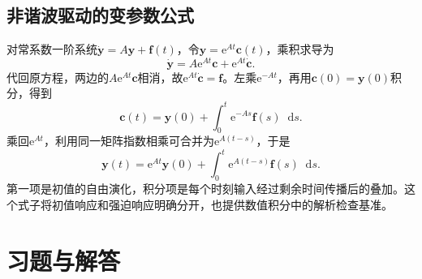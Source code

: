 \documentclass[11pt,openany,fontset=fandol]{ctexbook}
\theoremstyle{plain}\newtheorem{theorem}{定理}[chapter]\newtheorem{proposition}[theorem]{命题}
\theoremstyle{definition}\newtheorem{definition}{定义}[chapter]\newtheorem{example}{例}[chapter]
\theoremstyle{remark}\newtheorem*{remark}{说明}
\newcommand{\dd}{\mathop{}\!\mathrm d}\newcommand{\ii}{\mathrm i}\newcommand{\ee}{\mathrm e}
\newcommand{\vct}[1]{\bm{#1}}\newcommand{\Rea}{\operatorname{Re}}\newcommand{\Ima}{\operatorname{Im}}
\begin{document}
\subsection{非谐波驱动的变参数公式}
对常系数一阶系统$\dot{\vct y}=A\vct y+\vct f(t)$，令$\vct y=\ee^{At}\vct c(t)$，乘积求导为
\[\dot{\vct y}=A\ee^{At}\vct c+\ee^{At}\dot{\vct c}.\]
代回原方程，两边的$A\ee^{At}\vct c$相消，故$\ee^{At}\dot{\vct c}=\vct f$。左乘$\ee^{-At}$，再用$\vct c(0)=\vct y(0)$积分，得到
\[\vct c(t)=\vct y(0)+\int_0^t\ee^{-As}\vct f(s)\dd s.\]
乘回$\ee^{At}$，利用同一矩阵指数相乘可合并为$\ee^{A(t-s)}$，于是
\[
\vct y(t)=\ee^{At}\vct y(0)+\int_0^t\ee^{A(t-s)}\vct f(s)\dd s.
\]
第一项是初值的自由演化，积分项是每个时刻输入经过剩余时间传播后的叠加。这个式子将初值响应和强迫响应明确分开，也提供数值积分中的解析检查基准。

\clearpage
\section*{习题与解答}
\end{document}

